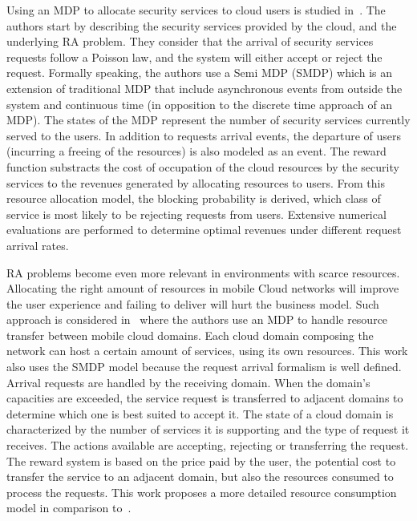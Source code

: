 Using an MDP to allocate security services to cloud users is studied in~\cite{Liang2011}.
The authors start by describing the security services provided by the cloud, and the underlying RA problem.
They consider that the arrival of security services requests follow a Poisson law, and the system will either accept or reject the request. Formally speaking, the authors use a Semi MDP (SMDP) which is an extension of traditional MDP that include asynchronous events from outside the system and continuous time (in opposition to the discrete time approach of an MDP).
The states of the MDP represent the number of security services currently served to the users. In addition to requests arrival events, the departure of users (incurring a freeing of the resources) is also modeled as an event. The reward function substracts the cost of occupation of the cloud resources by the security services to the revenues generated by allocating resources to users. 
From this resource allocation model, the blocking probability is derived, \ie which class of service is most likely to be rejecting requests from users. Extensive numerical evaluations are performed to determine optimal revenues under different request arrival rates.

RA problems become even more relevant in environments with scarce resources.
Allocating the right amount of resources in mobile Cloud networks will improve the user experience and failing to deliver will hurt the business model.
Such approach is considered in~\cite{Liang2012} where the authors use an MDP to handle resource transfer between mobile cloud domains. Each cloud domain composing the network can host a certain amount of services, using its own resources. 
This work also uses the SMDP model because the request arrival formalism is well defined.
Arrival requests are handled by the receiving domain. When the domain's capacities are exceeded, the service request is transferred to adjacent domains to determine which one is best suited to accept it.
The state of a cloud domain is characterized by the number of services it is supporting and the type of request it receives.
The actions available are accepting, rejecting or transferring the request.
The reward system is based on the price paid by the user, the potential cost to transfer the service to an adjacent domain, but also the resources consumed to process the requests. 
This work proposes a more detailed resource consumption model in comparison to~\cite{Liang2011}.

